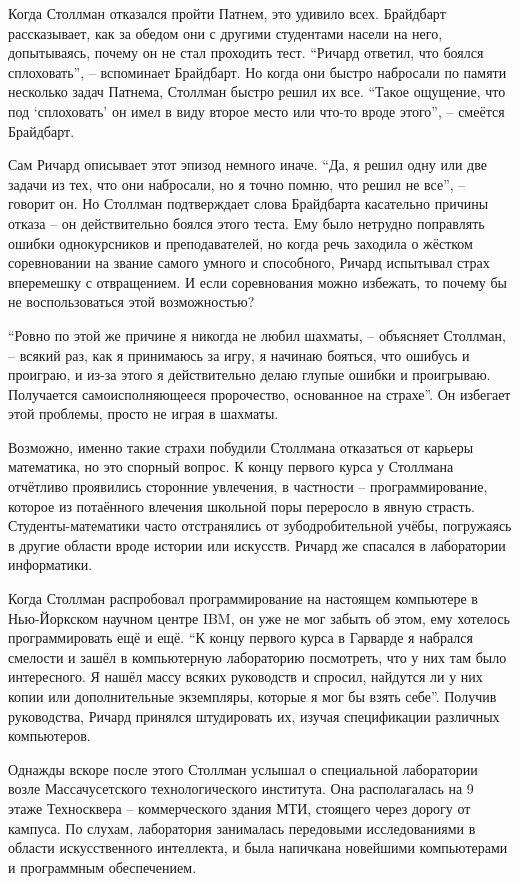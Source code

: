 Когда Столлман отказался пройти Патнем, это удивило всех. Брайдбарт рассказывает, как за обедом они с другими студентами насели на него, допытываясь, почему он не стал проходить тест. \enquote{Ричард ответил, что боялся сплоховать}, -- вспоминает Брайдбарт. Но когда они быстро набросали по памяти несколько задач Патнема, Столлман быстро решил их все. \enquote{Такое ощущение, что под \enquote{сплоховать} он имел в виду второе место или что-то вроде этого}, -- смеётся Брайдбарт.

Сам Ричард описывает этот эпизод немного иначе. \enquote{Да, я решил одну или две задачи из тех, что они набросали, но я точно помню, что решил не все}, -- говорит он. Но Столлман подтверждает слова Брайдбарта касательно причины отказа -- он действительно боялся этого теста. Ему было нетрудно поправлять ошибки однокурсников и преподавателей, но когда речь заходила о жёстком соревновании на звание самого умного и способного, Ричард испытывал страх вперемешку с отвращением. И если соревнования можно избежать, то почему бы не воспользоваться этой возможностью?

\enquote{Ровно по этой же причине я никогда не любил шахматы, -- объясняет Столлман, -- всякий раз, как я принимаюсь за игру, я начинаю бояться, что ошибусь и проиграю, и из-за этого я действительно делаю глупые ошибки и проигрываю. Получается самоисполняющееся пророчество, основанное на страхе}. Он избегает этой проблемы, просто не играя в шахматы.

Возможно, именно такие страхи побудили Столлмана отказаться от карьеры математика, но это спорный вопрос. К концу первого курса у Столлмана отчётливо проявились сторонние увлечения, в частности -- программирование, которое из потаённого влечения школьной поры переросло в явную страсть. Студенты-математики часто отстранялись от зубодробительной учёбы, погружаясь в другие области вроде истории или искусств. Ричард же спасался в лаборатории информатики.

Когда Столлман распробовал программирование на настоящем компьютере в Нью-Йоркском научном центре IBM, он уже не мог забыть об этом, ему хотелось программировать ещё и ещё. \enquote{К концу первого курса в Гарварде я набрался смелости и зашёл в компьютерную лабораторию посмотреть, что у них там было интересного. Я нашёл массу всяких руководств и спросил, найдутся ли у них копии или дополнительные экземпляры, которые я мог бы взять себе}. Получив руководства, Ричард принялся штудировать их, изучая спецификации различных компьютеров.

Однажды вскоре после этого Столлман услышал о специальной лаборатории возле Массачусетского технологического института. Она располагалась на 9 этаже Техносквера -- коммерческого здания МТИ, стоящего через дорогу от кампуса. По слухам, лаборатория занималась передовыми исследованиями в области искусственного интеллекта, и была напичкана новейшими компьютерами и программным обеспечением.

